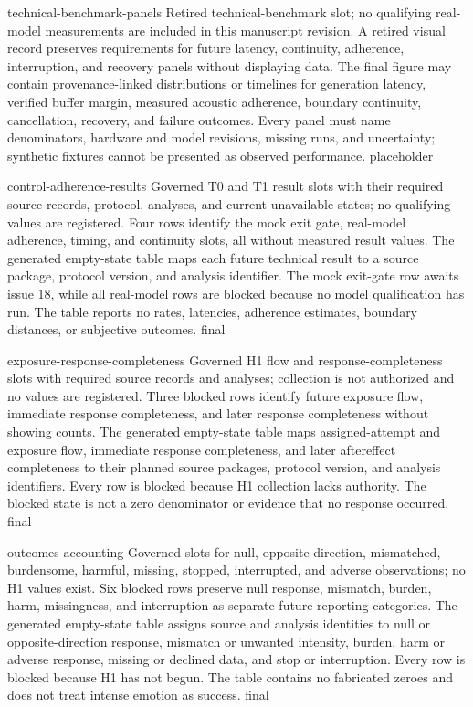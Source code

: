 \AntidoteDeclareVisualText
  {technical-benchmark-panels}
  {Retired technical-benchmark slot; no qualifying real-model measurements are included in this manuscript revision.}
  {A retired visual record preserves requirements for future latency, continuity, adherence, interruption, and recovery panels without displaying data.}
  {The final figure may contain provenance-linked distributions or timelines for generation latency, verified buffer margin, measured acoustic adherence, boundary continuity, cancellation, recovery, and failure outcomes. Every panel must name denominators, hardware and model revisions, missing runs, and uncertainty; synthetic fixtures cannot be presented as observed performance.}
  {placeholder}

\AntidoteDeclareVisualText
  {control-adherence-results}
  {Governed T0 and T1 result slots with their required source records, protocol, analyses, and current unavailable states; no qualifying values are registered.}
  {Four rows identify the mock exit gate, real-model adherence, timing, and continuity slots, all without measured result values.}
  {The generated empty-state table maps each future technical result to a source package, protocol version, and analysis identifier. The mock exit-gate row awaits issue 18, while all real-model rows are blocked because no model qualification has run. The table reports no rates, latencies, adherence estimates, boundary distances, or subjective outcomes.}
  {final}

\AntidoteDeclareVisualText
  {exposure-response-completeness}
  {Governed H1 flow and response-completeness slots with required source records and analyses; collection is not authorized and no values are registered.}
  {Three blocked rows identify future exposure flow, immediate response completeness, and later response completeness without showing counts.}
  {The generated empty-state table maps assigned-attempt and exposure flow, immediate response completeness, and later aftereffect completeness to their planned source packages, protocol version, and analysis identifiers. Every row is blocked because H1 collection lacks authority. The blocked state is not a zero denominator or evidence that no response occurred.}
  {final}

\AntidoteDeclareVisualText
  {outcomes-accounting}
  {Governed slots for null, opposite-direction, mismatched, burdensome, harmful, missing, stopped, interrupted, and adverse observations; no H1 values exist.}
  {Six blocked rows preserve null response, mismatch, burden, harm, missingness, and interruption as separate future reporting categories.}
  {The generated empty-state table assigns source and analysis identities to null or opposite-direction response, mismatch or unwanted intensity, burden, harm or adverse response, missing or declined data, and stop or interruption. Every row is blocked because H1 has not begun. The table contains no fabricated zeroes and does not treat intense emotion as success.}
  {final}

